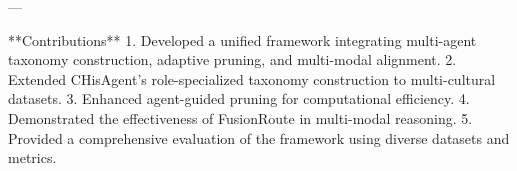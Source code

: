 ---

**Contributions**  
1. Developed a unified framework integrating multi-agent taxonomy construction, adaptive pruning, and multi-modal alignment.  
2. Extended CHisAgent's role-specialized taxonomy construction to multi-cultural datasets.  
3. Enhanced agent-guided pruning for computational efficiency.  
4. Demonstrated the effectiveness of FusionRoute in multi-modal reasoning.  
5. Provided a comprehensive evaluation of the framework using diverse datasets and metrics.  

